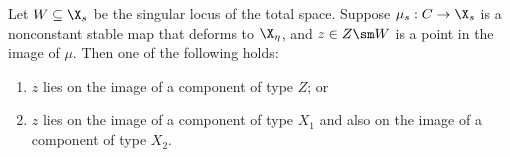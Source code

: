 \documentclass[12pt]{article}
\theoremstyle{plain}
\begin{document}
\begin{lemma} \label{lemma:breaking}
Let $W \subseteq \X_s$ be the singular locus of the total space. Suppose $\mu_s : C \to \X_s$ is a nonconstant stable map that deforms to $\X_\eta$, and $z \in Z \sm W$ is a point in the image of $\mu$. Then one of the following holds:
\begin{enumerate}
    \item $z$ lies on the image of a component of type $Z$; or
    \item $z$ lies on the image of a component of type $X_1$ and also on the image of a component of type $X_2$.
\end{enumerate}
\end{lemma}
\end{document}
